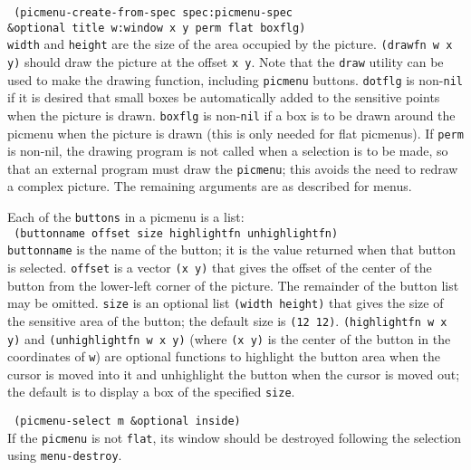 \vspace{-0.1in}
{\tt \hspace*{0.5in} (picmenu-create-from-spec spec:picmenu-spec \\
\hspace*{1.5in} \&optional title w:window x y perm flat boxflg)} \\

\vspace{-0.1in}
{\tt width} and {\tt height} are the size of the area occupied by the
picture.  {\tt (drawfn w x y)} should draw the picture at the offset
{\tt x y}.  Note that the {\tt draw} utility can be used to
make the drawing function, including {\tt picmenu} buttons.
{\tt dotflg} is non-{\tt nil} if it is desired that small boxes be
automatically added to the sensitive points when the picture is drawn.
{\tt boxflg} is non-{\tt nil} if a box is to be drawn around the picmenu
when the picture is drawn (this is only needed for flat
picmenus).  If {\tt perm} is non-nil, the drawing program is not called when
a selection is to be made, so that an external program must draw the
{\tt picmenu}; this avoids the need to redraw a complex picture.
The remaining arguments are as described for menus.

Each of the {\tt buttons} in a picmenu is a list: \\

\vspace{-0.1in}
{\tt \hspace*{0.5in} (buttonname offset size highlightfn unhighlightfn)} \\

\vspace{-0.1in}
{\tt buttonname} is the name of the button; it is the value returned when that
button is selected.
{\tt offset} is a vector {\tt (x y)} that gives the offset of the center
of the button from the lower-left corner of the picture.
The remainder of the button list may be omitted.
{\tt size} is an optional list {\tt (width height)} that gives the size of the
sensitive area of the button; the default size is {\tt (12\ 12)}.
{\tt (highlightfn w x y)} and {\tt (unhighlightfn w x y)} (where {\tt (x y)}
is the center of the button in the coordinates of {\tt w}) are optional
functions to highlight the button area when the cursor is moved into it and
unhighlight the button when the cursor is moved out; the default is to
display a box of the specified {\tt size}.

{\tt \hspace*{0.5in} (picmenu-select m \&optional inside)} \\
If the {\tt picmenu} is not {\tt flat}, its window should be destroyed
following the selection using {\tt menu-destroy}.

